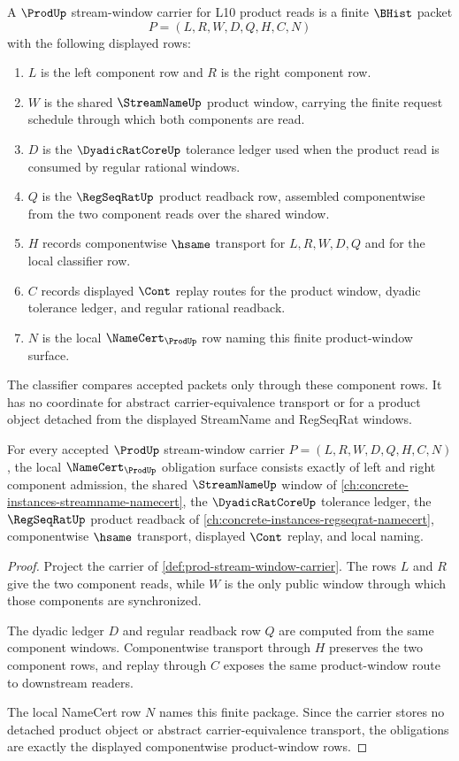 \begin{definition}
\label{def:prod-stream-window-carrier}
A $\ProdUp$ stream-window carrier for L10 product reads is a finite $\BHist$ packet
$$
P=(L,R,W,D,Q,H,C,N)
$$
with the following displayed rows:
\begin{enumerate}
\item $L$ is the left component row and $R$ is the right component row.
\item $W$ is the shared $\StreamNameUp$ product window, carrying the finite request schedule through which both components are read.
\item $D$ is the $\DyadicRatCoreUp$ tolerance ledger used when the product read is consumed by regular rational windows.
\item $Q$ is the $\RegSeqRatUp$ product readback row, assembled componentwise from the two component reads over the shared window.
\item $H$ records componentwise $\hsame$ transport for $L,R,W,D,Q$ and for the local classifier row.
\item $C$ records displayed $\Cont$ replay routes for the product window, dyadic tolerance ledger, and regular rational readback.
\item $N$ is the local $\NameCert_{\ProdUp}$ row naming this finite product-window surface.
\end{enumerate}
The classifier compares accepted packets only through these component rows. It has no coordinate for abstract carrier-equivalence transport or for a product object detached from the displayed StreamName and RegSeqRat windows.
\end{definition}

\begin{theorem}
\label{thm:prod-stream-window-namecert-obligations}
For every accepted $\ProdUp$ stream-window carrier $P=(L,R,W,D,Q,H,C,N)$, the local $\NameCert_{\ProdUp}$ obligation surface consists exactly of left and right component admission, the shared $\StreamNameUp$ window of \autoref{ch:concrete-instances-streamname-namecert}, the $\DyadicRatCoreUp$ tolerance ledger, the $\RegSeqRatUp$ product readback of \autoref{ch:concrete-instances-regseqrat-namecert}, componentwise $\hsame$ transport, displayed $\Cont$ replay, and local naming.
\end{theorem}
\begin{proof}
Project the carrier of \autoref{def:prod-stream-window-carrier}. The rows $L$ and $R$ give the two component reads, while $W$ is the only public window through which those components are synchronized.

The dyadic ledger $D$ and regular readback row $Q$ are computed from the same component windows. Componentwise transport through $H$ preserves the two component rows, and replay through $C$ exposes the same product-window route to downstream readers.

The local NameCert row $N$ names this finite package. Since the carrier stores no detached product object or abstract carrier-equivalence transport, the obligations are exactly the displayed componentwise product-window rows.
\end{proof}


